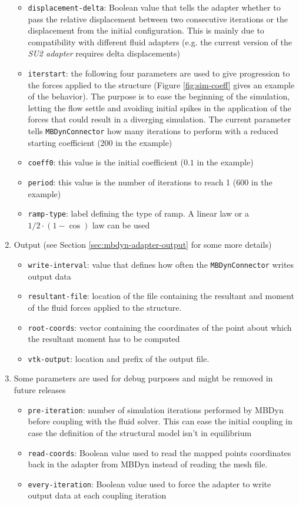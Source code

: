 \begin{enumerate}
    \begin{itemize}
        \item \texttt{displacement-delta}: Boolean value that tells the adapter whether to pass the relative displacement between two consecutive iterations or the displacement from the initial configuration. This is mainly due to compatibility with different fluid adapters (e.g. the current version of the \textit{SU2 adapter} requires delta displacements)  
        \item \texttt{iterstart}: the following four parameters are used to give progression to the forces applied to the structure (Figure \ref{fig:sim-coeff} gives an example of the behavior). The purpose is to ease the beginning of the simulation, letting the flow settle and avoiding initial spikes in the application of the forces that could result in a diverging simulation.
        The current parameter tells \texttt{MBDynConnector} how many iterations to perform with a reduced starting coefficient (200 in the example)
        \item \texttt{coeff0}: this value is the initial coefficient ($0.1$ in the example)
        \item \texttt{period}: this value is the number of iterations to reach 1 (600 in the example)
        \item \texttt{ramp-type}: label defining the type of ramp. A linear law or a $1/2 \cdot (1-\cos)$ law can be used
    \end{itemize}
    \item Output (see Section \ref{sec:mbdyn-adapter-output} for some more details)
    \begin{itemize}
        \item \texttt{write-interval}: value that defines how often the \texttt{MBDynConnector} writes output data
        \item \texttt{resultant-file}: location of the file containing the resultant and moment of the fluid forces applied to the structure. 
        \item \texttt{root-coords}: vector containing the coordinates of the point about which the resultant moment has to be computed
        \item \texttt{vtk-output}: location and prefix of the output file. 
    \end{itemize}
    \item Some parameters are used for debug purposes and might be removed in future releases
    \begin{itemize}
        \item \texttt{pre-iteration}: number of simulation iterations performed by MBDyn before coupling with the fluid solver. This can ease the initial coupling in case the definition of the structural model isn't in equilibrium
        \item \texttt{read-coords}: Boolean value used to read the mapped points coordinates back in the adapter from MBDyn instead of reading the mesh file. 
        \item \texttt{every-iteration}: Boolean value used to force the adapter to write output data at each coupling iteration 
    \end{itemize}
\end{enumerate}
